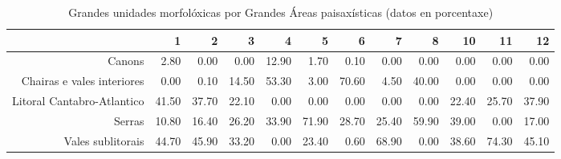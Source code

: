 \begin{table}[p]
\centering
\caption{Grandes unidades morfolóxicas por Grandes Áreas paisaxísticas (datos en porcentaxe)} 
\label{xtaboa1p}
\begin{tabular}{rrrrrrrrrrrr}
  \hline
 & 1 & 2 & 3 & 4 & 5 & 6 & 7 & 8 & 10 & 11 & 12 \\ 
  \hline
Canons & 2.80 & 0.00 & 0.00 & 12.90 & 1.70 & 0.10 & 0.00 & 0.00 & 0.00 & 0.00 & 0.00 \\ 
  Chairas e vales interiores & 0.00 & 0.10 & 14.50 & 53.30 & 3.00 & 70.60 & 4.50 & 40.00 & 0.00 & 0.00 & 0.00 \\ 
  Litoral Cantabro-Atlantico & 41.50 & 37.70 & 22.10 & 0.00 & 0.00 & 0.00 & 0.00 & 0.00 & 22.40 & 25.70 & 37.90 \\ 
  Serras & 10.80 & 16.40 & 26.20 & 33.90 & 71.90 & 28.70 & 25.40 & 59.90 & 39.00 & 0.00 & 17.00 \\ 
  Vales sublitorais & 44.70 & 45.90 & 33.20 & 0.00 & 23.40 & 0.60 & 68.90 & 0.00 & 38.60 & 74.30 & 45.10 \\ 
   \hline
\end{tabular}
\end{table}
